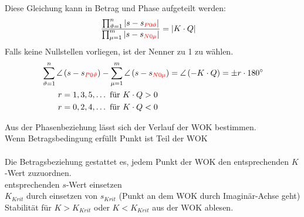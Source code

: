 	Diese Gleichung kann in Betrag und Phase aufgeteilt werden:
	\begin{align*}
		& \frac{\prod_{\vartheta=1}^{n}\left|s-s_{\color{red}{P0\vartheta}}\right|}{\prod_{\mu=1}^{m}\left|s-s_{\color{red}{N0\mu}}\right|} = |K \cdot Q|
	\end{align*}
	Falls keine Nullstellen vorliegen, ist der Nenner zu 1 zu wählen.
	\begin{align*}
		& \sum_{\vartheta=1}^{n} \angle\left(s-s_{\color{red}{P0\vartheta}}\right) - \sum_{\mu=1}^{m} \angle\left(s-s_{\color{red}{N0\mu}}\right) = \angle\left(-K \cdot Q\right) = \pm r \cdot 180^\circ \\
		& \qquad r = 1,3,5,\ldots \text{ für }K \cdot Q > 0 \\
		& \qquad r = 0,2,4,\ldots \text{ für }K \cdot Q < 0
	\end{align*}

	Aus der Phasenbeziehung lässt sich der Verlauf der WOK bestimmen.\\
	{\footnotesize Wenn Betragsbedingung erfüllt \textrightarrow Punkt ist Teil der WOK}
	\\
	\\
	Die Betragsbeziehung gestattet es, jedem Punkt der WOK den entsprechenden \(K\)-Wert zuzuordnen. \\
	{\footnotesize 
		entsprechenden \(s\)-Wert einsetzen \\
		\(K_{Krit}\) durch einsetzen von \(s_{Krit}\) (Punkt an dem WOK durch Imaginär-Achse geht)\\
		Stabilität für \(K > K_{Krit}\) oder \(K < K_{Krit}\) aus der WOK ablesen.
	}

